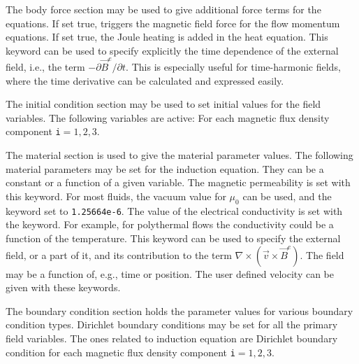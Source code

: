 The body force section may be used to give additional force terms for the equations.
\sifbegin
{} If set true, triggers the magnetic
field force for the flow momentum equations.
 If set true, the Joule heating is added in the
heat equation.
 This keyword can be used to specify
explicitly the time dependence of the external field, i.e., the term
$-\partial\vec{B}^e/\partial t$. This is especially useful for time-harmonic
fields, where the time derivative can be calculated and expressed easily.
\sifend

The initial condition section may be used to set initial values for the field
variables. The following variables are active:
\sifbegin
{} 
For each magnetic flux density component {\tt i}$=1,2,3$.
\sifend

The material section is used to give the material parameter values. The
following material parameters may be set for the induction equation. They can
be a constant or a function of a given variable.
\sifbegin
{} The magnetic permeability is set with
this keyword. For most fluids, the vacuum value for $\mu_0$ can be used,
and the keyword set to {\tt 1.25664e-6}.
 The value of the electrical
conductivity is set with the keyword. For example, for polythermal flows the
conductivity could be a function of the temperature.
 This keyword can be used to specify
the external field, or a part of it, and its contribution to the term
$\nabla\times(\vec{v}\times \vec{B}^e)$. The field may be a function of, e.g.,
time or position.
The user defined velocity can be given with these keywords.
\sifend

The boundary condition section holds the parameter values for various
boundary condition types. Dirichlet boundary conditions may be
set for all the primary field variables. The ones related to induction equation
are
\sifbegin
{} 
Dirichlet boundary condition
for each magnetic flux density component {\tt i}$=1,2,3$.
\sifend

\sifend


%
%
